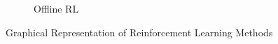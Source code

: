 \begin{figure}[htb]
\begin{subfigure}[b]{0.35\textwidth}
         \caption{Offline RL}
         \label{fig:offline}
     \end{subfigure}
    \hfill
    \caption{Graphical Representation of Reinforcement Learning Methods \cite{levine202rl_tutorial}}
    \label{fig:rl_methods}
\end{figure}

